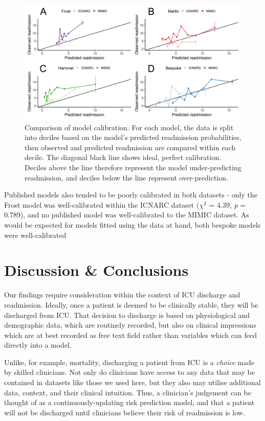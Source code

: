 \documentclass[onecolumn]{article}
\begin{document}
\begin{figure}
\centering
	\includegraphics[width=\textwidth]{calibration.png}
	\caption{Comparison of model calibration. For each model, the data is split into deciles based on the model's predicted readmission probabilities, then observed and predicted readmission are compared within each decile. The diagonal black line shows ideal, perfect calibration. Deciles above the line therefore represent the model under-predicting readmission, and deciles below the line represent over-prediction.}
	\label{CalibrationFig}
\end{figure}

Published models also tended to be poorly calibrated in both datasets - only the Frost model was well-calibrated within the ICNARC dataset ($\chi^{2}$ = 4.39, \textit{p} = 0.789), and no published model was well-calibrated to the MIMIC dataset. As would be expected for models fitted using the data at hand, both bespoke models were well-calibrated


\section{Discussion \& Conclusions}

Our findings require consideration within the context of ICU discharge and readmission. Ideally, once a patient is deemed to be clinically stable, they will be discharged from ICU. That decision to discharge is based on physiological and demographic data, which are routinely recorded, but also on clinical impressions which are at best recorded as free text field rather than variables which can feed directly into a model.

Unlike, for example, mortality, discharging a patient from ICU is a \textit{choice} made by skilled clinicians. Not only do clinicians have access to any data that may be contained in datasets like those we used here, but they also may utilise additional data, context, and their clinical intuition. Thus, a clinician's judgement can be thought of as a continuously-updating risk prediction model, and that a patient will not be discharged until clinicians believe their risk of readmission is low. 
\end{document}
